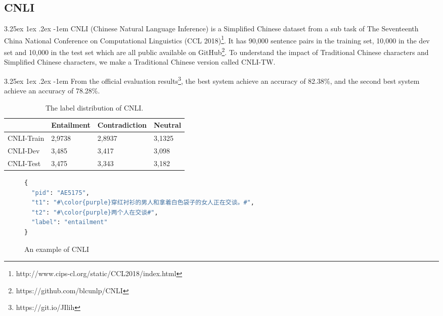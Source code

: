 \documentclass[12pt]{article}
\makeatletter
\renewcommand\paragraph{\@startsection{paragraph}{5}{\z@}%
  {3.25ex \@plus1ex \@minus.2ex}%
  {-1em}%
  {\normalfont\normalsize\bfseries}}
\makeatother
\begin{document}
\begin{CJK*}{UTF8}{bkai}
\begin{spacing}{1.77}
\subsection{CNLI}
\paragraph{}
CNLI (Chinese Natural Language Inference) is a Simplified Chinese dataset from a sub task of The Seventeenth China National Conference on Computational Linguistics (CCL 2018)\footnote{http://www.cips-cl.org/static/CCL2018/index.html}. It has 90,000 sentence pairs in the training set, 10,000 in the dev set and 10,000 in the test set which are all public available on GitHub\footnote{https://github.com/blcunlp/CNLI}. To understand the impact of Traditional Chinese characters and Simplified Chinese characters, we make a Traditional Chinese version called CNLI-TW.

\paragraph{}
From the official evaluation results\footnote{https://git.io/JIlih}, the best system achieve an accuracy of 82.38\%, and the second best system achieve an accuracy of 78.28\%.

\begin{table}[H]
  \centering
  \setlength{\extrarowheight}{-3pt}
  \begin{tabular}{|l|R{3cm}|R{3cm}|R{3cm}|}
  \hline
             & Entailment & Contradiction & Neutral \\ \hline
  CNLI-Train & 2,9738     & 2,8937        & 3,1325  \\ \hline
  CNLI-Dev   & 3,485      & 3,417         & 3,098   \\ \hline
  CNLI-Test  & 3,475      & 3,343         & 3,182   \\ \hline
  \end{tabular}
  \caption{The label distribution of CNLI.}

\end{table}
\begin{figure}
\caption{An example of CNLI}
\begin{CJK*}{UTF8}{gbsn}
\begin{lstlisting}[language=Python, escapechar=\#]
{
  "pid": "AE5175",
  "t1": "#\color{purple}穿红衬衫的男人和拿着白色袋子的女人正在交谈。#",
  "t2": "#\color{purple}两个人在交谈#",
  "label": "entailment"
}
\end{lstlisting}
\end{CJK*}
\end{figure}


\end{spacing}
\end{CJK*}
\end{document}
